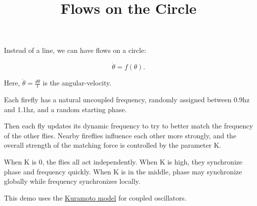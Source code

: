 \documentclass{article}
\title{Flows on the Circle}
\begin{document}
Instead of a line, we can have flows on a circle:

\[ \dot{\theta} = f(\theta). \]

Here, $ \dot{\theta} = \frac{d\theta}{t}$ is the \@{angular-velocity}.


Each firefly has a natural uncoupled frequency, randomly assigned between 0.9hz and 1.1hz, and a random starting phase.

Then each fly updates its dynamic frequency to try to better match the frequency of the other flies. Nearby fireflies influence each other more strongly, and the overall strength of the matching force is controlled by the parameter K.

When K is 0, the flies all act independently. When K is high, they synchronize phase and frequency quickly. When K is in the middle, phase may synchronize globally while frequency synchronizes locally.

This demo uses the \href{https://en.wikipedia.org/wiki/Kuramoto_model}{Kuramoto model} for coupled oscillators.
\end{document}
